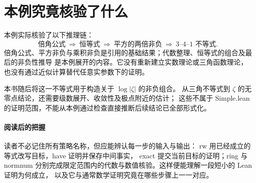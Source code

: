 \documentclass[UTF8,fontset=fandol,a4paper,11pt]{ctexart}
\newcommand{\code}[1]{{\small\ttfamily\def\_{\textunderscore\allowbreak}#1}}
\begin{document}
\section{本例究竟核验了什么}

本例实际核验了以下推理链：
\[
  \text{倍角公式}
  \ \Longrightarrow\ 
  \text{恒等式}
  \ \Longrightarrow\ 
  \text{平方的两倍非负}
  \ \Longrightarrow\ 
  \text{3--4--1 不等式}.
\]
倍角公式、平方非负与乘积非负是引用的基础结果；代数整理、恒等式的组合及最后的非负性推导
是本例展开的内容。它没有重新建立实数理论或三角函数理论，也没有通过近似计算替代任意实参数下的证明。

本书随后将这一不等式用于构造关于 $\log|\zeta|$ 的非负组合。
从三角不等式到 $\zeta$ 的无零点结论，还需要级数展开、收敛性及极点附近的估计；
这些不属于 \code{Simple.lean} 的证明范围，不能从本例通过检查直接推断后续结论已全部形式化。

\paragraph{阅读后的把握}
读者不必记住所有策略名称，但应能辨认每一步的输入与输出：
\code{rw} 用已经成立的等式改写目标，\code{have} 证明并保存中间事实，
\code{exact} 提交当前目标的证明；\code{ring} 与 \code{norm\_num}
分别完成限定范围内的代数与数值核验。这样便能理解一段短小的 Lean 证明为何成立，
以及它与通常数学证明究竟在哪些步骤上一一对应。
\end{document}
